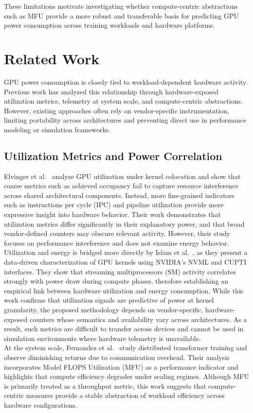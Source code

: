 \documentclass[runningheads]{llncs}
\begin{document}
These limitations motivate investigating whether compute-centric abstractions such as MFU provide a more robust and transferable basis for predicting GPU power consumption across training workloads and hardware platforms.


\section{Related Work}\label{related work}
GPU power consumption is closely tied to workload-dependent hardware activity. Previous work has analyzed this relationship through hardware-exposed utilization metrics, telemetry at system scale, and compute-centric abstractions. However, existing approaches often rely on vendor-specific instrumentation, limiting portability across architectures and preventing direct use in performance modeling or simulation frameworks.

\subsection{Utilization Metrics and Power Correlation}
Elvinger et al.~\cite{elvinger-2025} analyze GPU utilization under kernel colocation and show that coarse metrics such as achieved occupancy fail to capture resource interference across shared architectural components. Instead, more fine-grained indicators such as instructions per cycle (IPC) and pipeline utilization provide more expressive insight into hardware behavior. Their work demonstrates that utilization metrics differ significantly in their explanatory power, and that broad vendor-defined counters may obscure relevant activity. However, their study focuses on performance interference and does not examine energy behavior.\\
Utilization and energy is bridged more directly by Islam et al.~\cite{islam-2024}, as they present a data-driven characterization of GPU kernels using NVIDIA's NVML and CUPTI interfaces. They show that streaming multiprocessors (SM) activity correlates strongly with power draw during compute phases, therefore establishing an empirical link between hardware utilization and energy consumption. While this work confirms that utilization signals are predictive of power at kernel granularity, the proposed methodology depends on vendor-specific, hardware-exposed counters whose semantics and availability vary across architectures. As a result, such metrics are difficult to transfer across devices and cannot be used in simulation environments where hardware telemetry is unavailable.\\
At the system scale, Fernandez et al.~\cite{fernandez-2024} study distributed transformer training and observe diminishing returns due to communication overhead. Their analysis incorporates Model FLOPS Utilization (MFU) as a performance indicator and highlights that compute efficiency degrades under scaling regimes. Although MFU is primarily treated as a throughput metric, this work suggests that compute-centric measures provide a stable abstraction of workload efficiency across hardware configurations.\\
\end{document}
